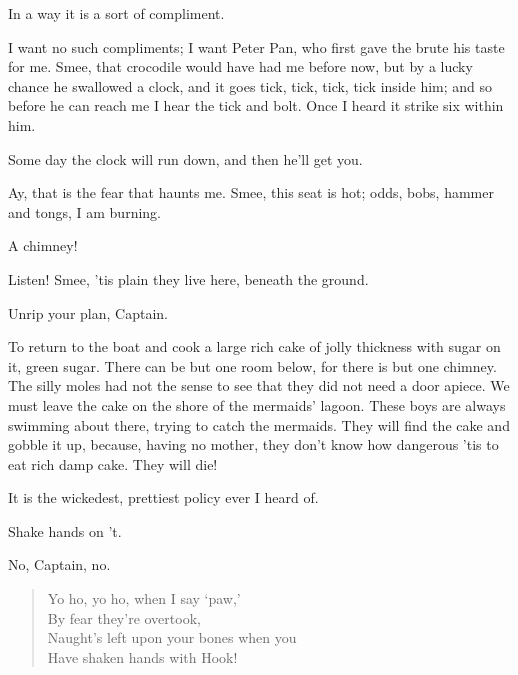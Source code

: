 \begin{drama}
In a way it is a sort of compliment.

I want no such compliments; I want Peter Pan, who first gave the brute his taste for me.
Smee, that crocodile would have had me before now, but by a lucky chance he swallowed a clock, and it goes tick, tick, tick, tick inside him; and so before he can reach me I hear the tick and bolt.
Once I heard it strike six within him.

Some day the clock will run down, and then he'll get you.

Ay, that is the fear that haunts me.
Smee, this seat is hot; odds, bobs, hammer and tongs, I am burning.


\smeespeaks
A chimney!

Listen!
Smee, 'tis plain they live here, beneath the ground.

Unrip your plan, Captain.

\hookspeaks
To return to the boat and cook a large rich cake of jolly thickness with sugar on it, green sugar.
There can be but one room below, for there is but one chimney.
The silly moles had not the sense to see that they did not need a door apiece.
We must leave the cake on the shore of the mermaids' lagoon.
These boys are always swimming about there, trying to catch the mermaids.
They will find the cake and gobble it up, because, having no mother, they don't know how dangerous 'tis to eat rich damp cake.
They will die!

It is the wickedest, prettiest policy ever I heard of.

Shake hands on 't.

\smeespeaks
No, Captain, no.


\hookspeaks
\begin{verse}
	Yo ho, yo ho, when I say ‘paw,'\\
	By fear they're overtook,\\
	Naught's left upon your bones when you\\
	Have shaken hands with Hook!
\end{verse}


\end{drama}

